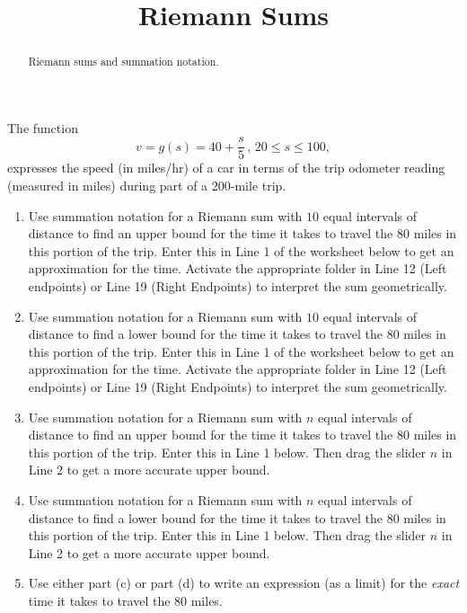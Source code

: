 \documentclass{ximera}
\title{Riemann Sums}
\begin{document}
\begin{abstract}
Riemann sums and summation notation.
\end{abstract}
\maketitle



\begin{question} \label{QPdfer34334}
The function
\[
   v = g(s) = 40 + \frac{s}{5} \, , \, 20\leq s \leq 100 ,
\]
expresses the speed (in miles/hr) of a car in terms of the trip odometer reading (measured in miles) during part of a 200-mile trip.

\begin{enumerate}
\item Use summation notation for a Riemann sum with $10$ equal intervals of distance to find an upper bound for the time it takes to travel the $80$ miles in this portion of the trip. Enter this in Line 1 of the worksheet below to get an approximation for the time. Activate the appropriate folder in Line 12 (Left endpoints) or Line 19 (Right Endpoints) to interpret the sum geometrically.

\item Use summation notation for a Riemann sum with $10$ equal intervals of distance to find a lower bound for the time it takes to travel the $80$ miles in this portion of the trip. Enter this in Line 1 of the worksheet below to get an  approximation for the time.
Activate the appropriate folder in Line 12 (Left endpoints) or Line 19 (Right Endpoints) to interpret the sum geometrically.

\item Use summation notation for a Riemann sum with $n$ equal intervals of distance to find an upper bound for the time it takes to travel the $80$ miles in this portion of the trip. Enter this in Line 1 below. Then drag the slider $n$ in Line 2 to get a more accurate upper bound.

\item Use summation notation for a Riemann sum with $n$ equal intervals of distance to find a lower bound for the time it takes to travel the $80$ miles in this portion of the trip. Enter this in Line 1 below. Then drag the slider $n$ in Line 2 to get a more accurate upper bound.

\item Use either part (c) or part (d) to write an expression (as a limit) for the \emph{exact} time it takes to travel the $80$ miles.


\end{enumerate}
\end{question}
\end{document}
